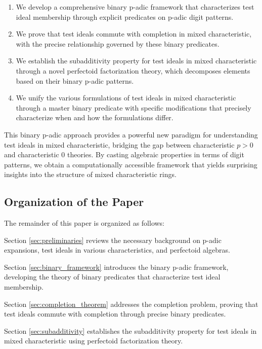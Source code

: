 \begin{enumerate}
    \item We develop a comprehensive binary p-adic framework that characterizes test ideal membership through explicit predicates on p-adic digit patterns.
    
    \item We prove that test ideals commute with completion in mixed characteristic, with the precise relationship governed by these binary predicates.
    
    \item We establish the subadditivity property for test ideals in mixed characteristic through a novel perfectoid factorization theory, which decomposes elements based on their binary p-adic patterns.
    
    \item We unify the various formulations of test ideals in mixed characteristic through a master binary predicate with specific modifications that precisely characterize when and how the formulations differ.
\end{enumerate}

This binary p-adic approach provides a powerful new paradigm for understanding test ideals in mixed characteristic, bridging the gap between characteristic $p > 0$ and characteristic 0 theories. By casting algebraic properties in terms of digit patterns, we obtain a computationally accessible framework that yields surprising insights into the structure of mixed characteristic rings.

\subsection{Organization of the Paper}

The remainder of this paper is organized as follows:

Section \ref{sec:preliminaries} reviews the necessary background on p-adic expansions, test ideals in various characteristics, and perfectoid algebras.

Section \ref{sec:binary_framework} introduces the binary p-adic framework, developing the theory of binary predicates that characterize test ideal membership.

Section \ref{sec:completion_theorem} addresses the completion problem, proving that test ideals commute with completion through precise binary predicates.

Section \ref{sec:subadditivity} establishes the subadditivity property for test ideals in mixed characteristic using perfectoid factorization theory.

